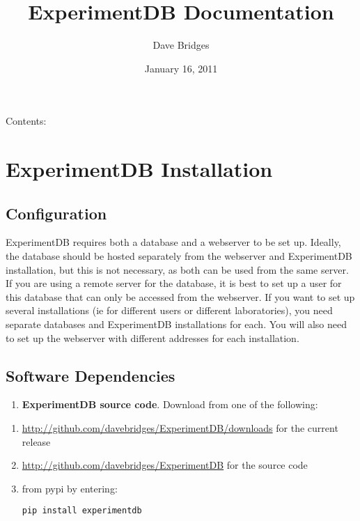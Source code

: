\documentclass[letterpaper,10pt,english]{sphinxmanual}
\title{ExperimentDB Documentation}
\date{January 16, 2011}
\author{Dave Bridges}
\begin{document}
\maketitle
\tableofcontents
{}\label{index::doc}


Contents:


\chapter{ExperimentDB Installation}
\label{installation:experimentdb-installation}\label{installation::doc}\label{installation:welcome-to-experimentdb-s-documentation}

\section{Configuration}
\label{installation:configuration}
ExperimentDB requires both a database and a webserver to be set up.  Ideally, the database should be hosted separately from the webserver and ExperimentDB installation, but this is not necessary, as both can be used from the same server.  If you are using a remote server for the database, it is best to set up a user for this database that can only be accessed from the webserver.  If you want to set up several installations (ie for different users or different laboratories), you need separate databases and ExperimentDB installations for each.  You will also need to set up the webserver with different addresses for each installation.


\section{Software Dependencies}
\label{installation:software-dependencies}\begin{enumerate}
\item {} 
\textbf{ExperimentDB source code}.  Download from one of the following:

\end{enumerate}
\begin{enumerate}
\item {} 
\href{http://github.com/davebridges/ExperimentDB/downloads}{http://github.com/davebridges/ExperimentDB/downloads} for the current release

\item {} 
\href{http://github.com/davebridges/ExperimentDB}{http://github.com/davebridges/ExperimentDB} for the source code

\item {} 
from pypi by entering:

\begin{Verbatim}[commandchars=@\[\]]
pip install experimentdb
\end{Verbatim}

\end{enumerate}
\end{document}
